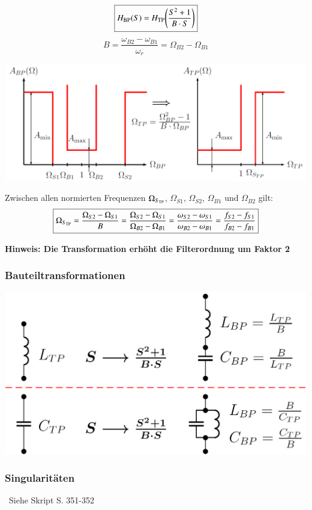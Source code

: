 \begin{minipage}[c]{0.4\columnwidth}
    $$ \boxed{H_{\rm BP}(S) = H_{\rm TP} \Bigg(\frac{S^2  + 1}{B \cdot S} \Bigg) } $$
    $$ \boxed{ B = \frac{\omega_{B2} - \omega_{B1}}{\omega_r} = \Omega_{B2} - \Omega_{B1} } $$
\end{minipage}
\hfill
\begin{minipage}[c]{0.58\columnwidth}
    \includegraphics[width=\columnwidth]{images/toleranzschema_BP_TP.png}
\end{minipage}

\vspace{0.2cm}
Zwischen allen normierten Frequenzen $\Omega_{S_{\rm TP}}$, $\Omega_{S1}$, $\Omega_{S2}$, $\Omega_{B1}$ und $\Omega_{B2}$ gilt:
$$ \boxed{ \Omega_{S_{\rm TP}} = \frac{\Omega_{S2} - \Omega_{S1}}{B} = \frac{\Omega_{S2} - \Omega_{S1}}{\Omega_{B2} - \Omega_{B1}}
    = \frac{\omega_{S2} - \omega_{S1}}{\omega_{B2} - \omega_{B1}} = \frac{f_{S2} - f_{S1}}{f_{B2} - f_{B1}} } $$

\textbf{Hinweis: Die Transformation erhöht die Filterordnung um Faktor 2}


\begin{minipage}[t]{0.48\columnwidth}
    \subsubsection{Bauteiltransformationen}

    \includegraphics[width=\columnwidth]{images/bauteiltransformation_TP_BP.png}
\end{minipage}
\hfill
\begin{minipage}[t]{0.48\columnwidth}
    \subsubsection{Singularitäten}

    \textrightarrow\ Siehe Skript S. 351-352
\end{minipage}



